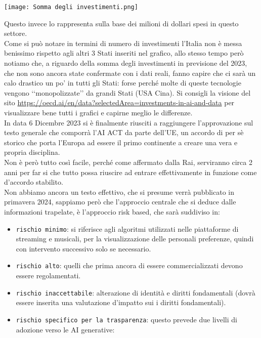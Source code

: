 \documentclass{article}
\begin{document}
\begin{center}
    \texttt{[image: Somma degli investimenti.png]}
\end{center}
\begin{justify}
    Questo invece lo rappresenta sulla base dei milioni di dollari spesi in questo settore.\citep{OECD_AI2}\\
    Come si può notare in termini di numero di investimenti l'Italia non è messa benissimo rispetto agli altri 3 Stati inseriti nel grafico, allo stesso tempo però notiamo che, a riguardo della somma degli investimenti in previsione del 2023, che non sono ancora state confermate con i dati reali, fanno capire che ci sarà un calo drastico un po' in tutti gli Stati: forse perché molte di queste tecnologie vengono ‘‘monopolizzate’’ da grandi Stati (USA Cina).
    Si consigli la visione del sito \url{https://oecd.ai/en/data?selectedArea=investments-in-ai-and-data} per visualizzare bene tutti i grafici e capirne meglio le differenze.\\
    In data 6 Dicembre 2023 si è finalmente riusciti a raggiungere l'approvazione sul testo generale che comporrà l'AI ACT da parte dell'UE, un accordo di per sè storico che porta l'Europa ad essere il primo continente a creare una vera e propria disciplina.\\
    Non è però tutto così facile, perché come affermato dalla Rai, serviranno circa 2 anni per far si che tutto possa riuscire ad entrare effettivamente in funzione come d'accordo stabilito.\citep{PA_Digitale_AI}\\
    Non abbiamo ancora un testo effettivo, che si presume verrà pubblicato in primavera 2024, sappiamo però che l'approccio centrale che si deduce dalle informazioni trapelate, è l'approccio risk based, che sarà suddiviso in:
    \begin{itemize}
        \item \texttt{rischio minimo}: si riferisce agli algoritmi utilizzati nelle piattaforme di streaming e musicali, per la visualizzazione delle personali preferenze, quindi con intervento successivo solo se necessario.
        \item \texttt{rischio alto}: quelli che prima ancora di essere commercializzati devono essere regolamentati.
        \item \texttt{rischio inaccettabile}: alterazione di identità e diritti fondamentali (dovrà essere inserita una valutazione d'impatto sui i diritti fondamentali).
        \item \texttt{rischio specifico per la trasparenza}: questo prevede due livelli di adozione verso le AI generative:

\end{itemize}
\end{justify}
\end{document}
